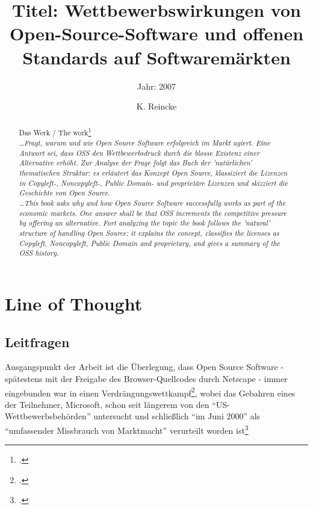 \documentclass[DIV=calc,BCOR=5mm,11pt,headings=small,oneside,abstract=true, toc=bib]{scrartcl}
\begin{document}

\titlehead{Literaturexzerpt}
\subject{Autor(en): Mundhenke}
\title{Titel: Wettbewerbswirkungen von Open-Source-Software und offenen
Standards auf Softwaremärkten}
\subtitle{Jahr: 2007 }
\author{K. Reincke}

\maketitle

\begin{abstract}
\noindent
Das Werk / The work\footcite[][]{Mundhenke2007a} \\
\noindent \itshape
\ldots Fragt, warum und wie Open Source Software erfolgreich im Markt agiert.
Eine Antwort sei, dass OSS den Wettbewerbsdruck durch die blosse Existenz einer
Alternative erhöht. Zur Analyse der Frage folgt das Buch der 'natürlichen'
thematischen Struktur: es erläutert das Konzept Open Source, klassiziert die
Lizenzen in Copyleft-, Noncopyleft-, Public Domain- und proprietäre Lizenzen und
skizziert die Geschichte von Open Source.\\
\noindent
\ldots This book asks why and how Open Source Software successfully works as
part of the economic markets. One answer shall be that OSS increments the
competitive pressure by offering an alternative. Fort analyzing the topic the
book follows the 'natural' structure of handling Open Source: it explains the
concept, classifies the licenses as Copyleft, Noncopyleft, Public Domain and
proprietary, and gives a summary of the OSS history.
\end{abstract}
\footnotesize
\normalsize

\section{Line of Thought}

\subsection{Leitfragen}

Ausgangspunkt der Arbeit ist die Überlegung, dass Open Source Software -
spätestens mit der Freigabe des Browser-Quellcodes durch Netscape - immer
eingebunden war in einen
Verdrängungswettkampf\footcite[vgl.][1]{Mundhenke2007a}, wobei das Gebahren
eines der Teilnehmer, Microsoft, schon seit längerem von den
\enquote{US-Wettbewerbsbehörden} untersucht und schließlich \enquote{im Juni
2000} als \enquote{umfassender Missbrauch von Marktmacht}
verurteilt worden ist\footcite[vgl.][2]{Mundhenke2007a}
\end{document}
